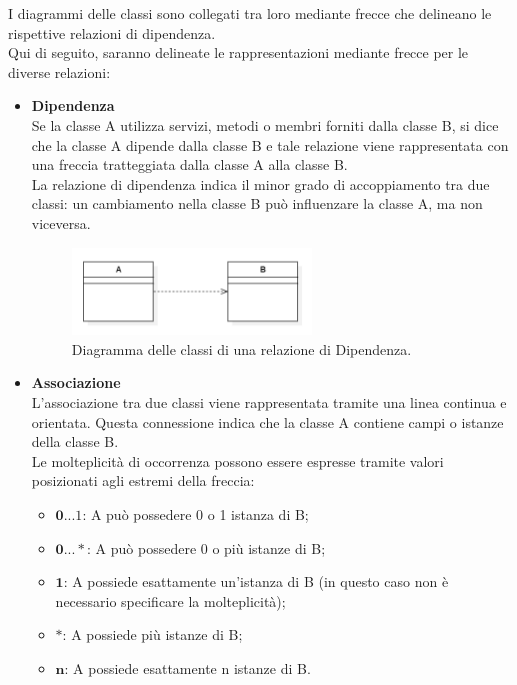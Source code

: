 I diagrammi delle classi sono collegati tra loro mediante frecce che delineano le rispettive relazioni di dipendenza. \\
Qui di seguito, saranno delineate le rappresentazioni mediante frecce per le diverse relazioni: \\
\begin{itemize}
    \item \textbf{Dipendenza}\\
    Se la classe A utilizza servizi, metodi o membri forniti dalla classe B, si dice che la classe A dipende dalla classe B e tale relazione viene rappresentata con una freccia tratteggiata dalla classe A alla classe B. \\
    La relazione di dipendenza indica il minor grado di accoppiamento tra due classi: un cambiamento nella classe B può influenzare la classe A, ma non viceversa.
    \begin{figure}[H]
        \centering
        \includegraphics[width=0.6\textwidth]{../Images/NormeDiProgetto/ClassDiagram_Dipendenza.PNG}
        \caption{Diagramma delle classi di una relazione di Dipendenza.}
    \end{figure}
    \item \textbf{Associazione}\\
    L'associazione tra due classi viene rappresentata tramite una linea continua e orientata. Questa connessione indica che la classe A contiene campi o istanze della classe B. \\
    Le molteplicità di occorrenza possono essere espresse tramite valori posizionati agli estremi della freccia:
    \begin{itemize}
        \item $\mathbf{0...1}$: A può possedere 0 o 1 istanza di B;
        \item $\mathbf{0...*}$: A può possedere 0 o più istanze di B;
        \item $\mathbf{1}$:  A possiede esattamente un'istanza di B (in questo caso non è necessario specificare la molteplicità);
        \item $\mathbf{*}$: A possiede più istanze di B;
        \item $\mathbf{n}$: A possiede esattamente n istanze di B.

\end{itemize}
\end{itemize}
